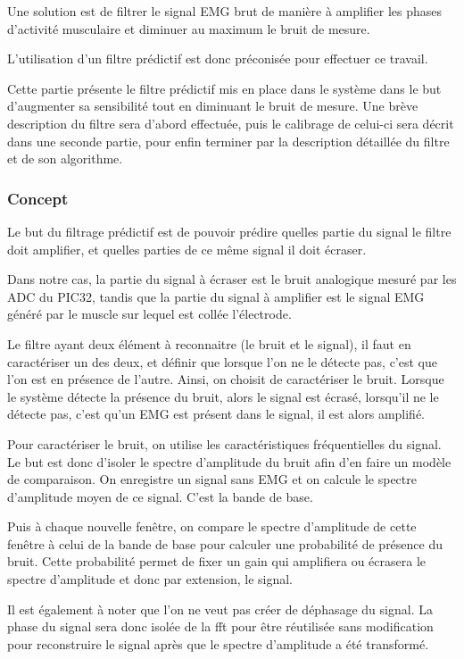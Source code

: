 \documentclass[letterpaper, twoside, 12pt, memoire, creativecommons, hyperref]{thETS}
\begin{document}
Une solution est de filtrer le signal EMG brut de manière à amplifier les phases d'activité musculaire et diminuer au maximum le bruit de mesure. 

L'utilisation d'un filtre prédictif est donc préconisée pour effectuer ce travail. 

Cette partie présente le filtre prédictif mis en place dans le système dans le but d'augmenter sa sensibilité tout en diminuant le bruit de mesure. Une brève description du filtre sera d'abord effectuée, puis le calibrage de celui-ci sera décrit dans une seconde partie, pour enfin terminer par la description détaillée du filtre et de son algorithme.

\subsubsection{Concept}

Le but du filtrage prédictif est de pouvoir prédire quelles partie du signal le filtre doit amplifier, et quelles parties de ce même signal il doit écraser.

Dans notre cas, la partie du signal à écraser est le bruit analogique mesuré par les ADC du PIC32, tandis que la partie du signal à amplifier est le signal EMG généré par le muscle sur lequel est collée l'électrode.

Le filtre ayant deux élément à reconnaitre (le bruit et le signal), il faut en caractériser un des deux, et définir que lorsque l'on ne le détecte pas, c'est que l'on est en présence de l'autre. Ainsi, on choisit de caractériser le bruit. Lorsque le système détecte la présence du bruit, alors le signal est écrasé, lorsqu'il ne le détecte pas, c'est qu'un EMG est présent dans le signal, il est alors amplifié.

Pour caractériser le bruit, on utilise les caractéristiques fréquentielles du signal. Le but est donc d'isoler le spectre d'amplitude du bruit afin d'en faire un modèle de comparaison. On enregistre un signal sans EMG et on calcule le spectre d'amplitude moyen de ce signal. C'est la bande de base.

Puis à chaque nouvelle fenêtre, on compare le spectre d'amplitude de cette fenêtre à celui de la bande de base pour calculer une probabilité de présence du bruit. Cette probabilité permet de fixer un gain qui amplifiera ou écrasera le spectre d'amplitude et donc par extension, le signal.

Il est également à noter que l'on ne veut pas créer de déphasage du signal. La phase du signal sera donc isolée de la fft pour être réutilisée sans modification pour reconstruire le signal après que le spectre d'amplitude a été transformé.  
\end{document}
